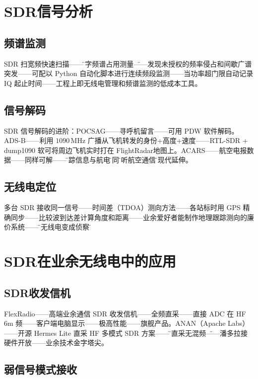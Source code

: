 \documentclass[12pt,UTF8]{ctexbook}
\begin{document}
\section{SDR信号分析}
\label{sec:sdr_analysis}

\subsection{频谱监测}

SDR 扫宽频快速扫描——\"数字频谱占用测量\"——发现未授权的频率侵占和间歇广谱突发——可配以 Python 自动化脚本进行连续频段监测——当功率超门限自动记录 IQ 起止时间——工程上即无线电管理和频谱监测的低成本工具。

\subsection{信号解码}

SDR 信号解码的进阶：POCSAG——寻呼机留言——可用 PDW 软件解码。ADS-B——利用 $1090\,\mathrm{MHz}$ 广播从飞机转发的身份+高度+速度——RTL-SDR + dump1090 软可将周边飞机实时打在 FlightRadar地图上。ACARS——航空电报数据——同样可解——\"追踪信息与航电\"如同\"收听航空通信\"的现代延伸。

\subsection{无线电定位}

多台 SDR 接收同一信号——时间差（TDOA）测向方法——各站标时用 GPS 精确同步——比较波到达差计算角度和距离——业余爱好者能制作地理跟踪测向的廉价系统——\"把无线电变成侦察\"。

\section{SDR在业余无线电中的应用}
\label{sec:sdr_ham}

\subsection{SDR收发信机}

FlexRadio——高端业余通信 SDR 收发信机——全频直采——直接 ADC 在 HF 6m 频——客户端电脑显示——极高性能——旗舰产品。ANAN（Apache Labs）——开源 Hermes Lite 直采 HF 多模式 SDR 方案——\"纯直采无混频\"——潘多拉接硬件开放——业余技术金字塔尖。

\subsection{弱信号模式接收}
\end{document}
